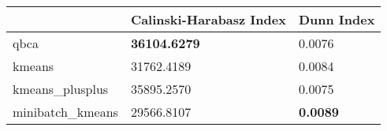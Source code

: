 \begin{table}[htbp]
\centering
\begin{tabular}{lll}
\toprule
 & Calinski-Harabasz Index & Dunn Index \\
\midrule
qbca & \textbf{36104.6279} & 0.0076 \\
kmeans & 31762.4189 & 0.0084 \\
kmeans_plusplus & 35895.2570 & 0.0075 \\
minibatch_kmeans & 29566.8107 & \textbf{0.0089} \\
\bottomrule
\end{tabular}
\end{table}
